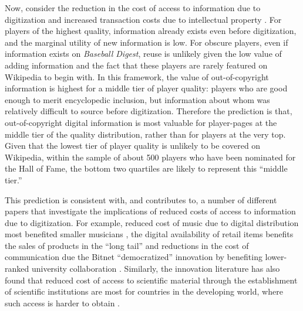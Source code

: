 \documentclass[11pt]{article}
\begin{document}
Now, consider the reduction in the cost of access to information due to digitization \citep{goldfarb_introduction_2014} and increased transaction costs due to intellectual property \citep{williams_intellectual_2013}. For players of the highest quality, information already exists even before digitization, and the marginal utility of new information is low. For obscure players, even if information exists on \emph{Baseball Digest}, reuse is unlikely given the low value of adding information and the fact that these players are rarely featured on Wikipedia to begin with. In this framework, the value of out-of-copyright information is highest for a middle tier of player quality: players who are good enough to merit encyclopedic inclusion, but information about whom was relatively difficult to source before digitization. Therefore the prediction is that, out-of-copyright digital information is most valuable for player-pages at the middle tier of the quality distribution, rather than for players at the very top. Given that the lowest tier of player quality is unlikely to be covered on Wikipedia, within the sample of about 500 players who have been nominated for the Hall of Fame, the bottom two quartiles are likely to represent this ``middle tier.''

This prediction is consistent with, and contributes to, a number of different papers that investigate the implications of reduced costs of access to information due to digitization. For example, reduced cost of music due to digital distribution most benefited smaller musicians \citep{mortimer_supply_2012}, the digital availability of retail items benefits the sales of products in the ``long tail'' \citep{brynjolfsson_goodbye_2011} and reductions in the cost of communication due the Bitnet ``democratized'' innovation by benefiting lower-ranked university collaboration \citep{agrawal_restructuring_2008}. Similarly, the innovation literature has also found that reduced cost of access to scientific material through the establishment of scientific institutions are most for countries in the developing world, where such access is harder to obtain \citep{furman_climbing_2011}.


\end{document}
